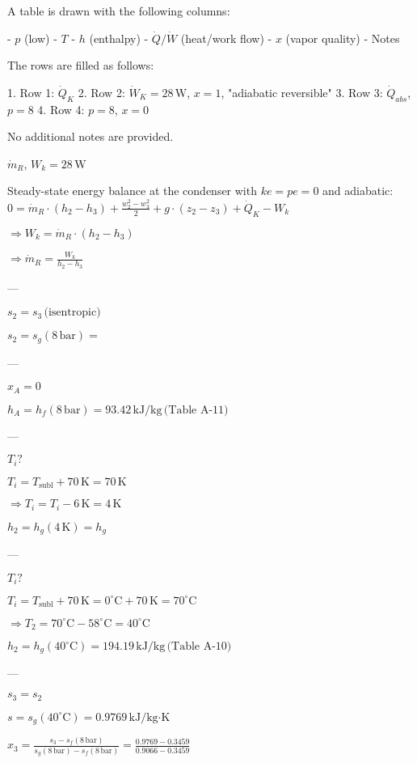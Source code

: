 A table is drawn with the following columns:  

- \( p \) (low)  
- \( T \)  
- \( h \) (enthalpy)  
- \( \dot{Q} / \dot{W} \) (heat/work flow)  
- \( x \) (vapor quality)  
- Notes  

The rows are filled as follows:  

1. Row 1: \( \dot{Q}_K \)  
2. Row 2: \( \dot{W}_K = 28 \, \text{W} \), \( x = 1 \), "adiabatic reversible"  
3. Row 3: \( \dot{Q}_{abs} \), \( p = 8 \)  
4. Row 4: \( p = 8 \), \( x = 0 \)  

No additional notes are provided.

\(\dot{m}_R\), \(W_k = 28 \, \text{W}\)  

Steady-state energy balance at the condenser with \(ke = pe = 0\) and adiabatic:  
\(0 = \dot{m}_R \cdot (h_2 - h_3) + \frac{w_2^2 - w_3^2}{2} + g \cdot (z_2 - z_3) + \dot{Q}_K - W_k\)  

\(\Rightarrow W_k = \dot{m}_R \cdot (h_2 - h_3)\)  

\(\Rightarrow \dot{m}_R = \frac{W_k}{h_2 - h_3}\)  

---

\(s_2 = s_3 \, \text{(isentropic)}\)  

\(s_2 = s_g (8 \, \text{bar}) =\)  

---

\(x_A = 0\)  

\(h_A = h_f (8 \, \text{bar}) = 93.42 \, \text{kJ/kg} \, \text{(Table A-11)}\)  

---

\(T_i?\)  

\(T_i = T_{\text{subl}} + 70 \, \text{K} = 70 \, \text{K}\)  

\(\Rightarrow T_i = T_i - 6 \, \text{K} = 4 \, \text{K}\)  

\(h_2 = h_g (4 \, \text{K}) = h_g\)  

---

\(T_i?\)  

\(T_i = T_{\text{subl}} + 70 \, \text{K} = 0^\circ \text{C} + 70 \, \text{K} = 70^\circ \text{C}\)  

\(\Rightarrow T_2 = 70^\circ \text{C} - 58^\circ \text{C} = 40^\circ \text{C}\)  

\(h_2 = h_g (40^\circ \text{C}) = 194.19 \, \text{kJ/kg} \, \text{(Table A-10)}\)  

---

\(s_3 = s_2\)  

\(s = s_g (40^\circ \text{C}) = 0.9769 \, \text{kJ/kg·K}\)  

\(x_3 = \frac{s_3 - s_f (8 \, \text{bar})}{s_g (8 \, \text{bar}) - s_f (8 \, \text{bar})} = \frac{0.9769 - 0.3459}{0.9066 - 0.3459}\)